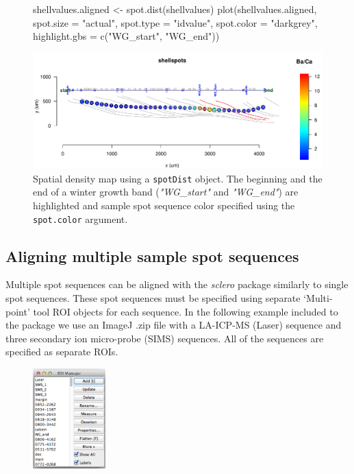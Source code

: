 \documentclass[11pt, a4paper]{article}
\newcommand{\sclero}{\textit{sclero}\xspace}
\begin{document}
\begin{figure}[H]
\begin{center}
\begin{Schunk}
\begin{Sinput}
 shellvalues.aligned <- spot.dist(shellvalues)
 plot(shellvalues.aligned, spot.size = "actual", spot.type = "idvalue",
   spot.color = "darkgrey", highlight.gbs = c("WG_start", "WG_end"))
\end{Sinput}
\end{Schunk}
\includegraphics{sclero_tutorial-plotvaluesalign}
\end{center}
\caption{Spatial density map using a \texttt{spotDist} object. The beginning and the end of a winter growth band (\textit{"WG\_start"} and \textit{"WG\_end"}) are highlighted and sample spot sequence color specified using the \texttt{spot.color} argument.
}
\end{figure}

\clearpage
\subsection{Aligning multiple sample spot sequences} \label{sec:multiple}

Multiple spot sequences can be aligned with the \sclero package similarly to single spot sequences. These spot sequences must be specified using separate `Multi-point' tool ROI objects for each sequence. In the following example included to the package we use an ImageJ .zip file with a LA-ICP-MS (Laser) sequence and three secondary ion micro-probe (SIMS) sequences. All of the sequences are specified as separate ROIs.

\begin{figure}[H]
\begin{center}
\includegraphics[width = 0.25\textwidth]{roi_manager_multi.png}
\end{center}
\end{figure}
\end{document}
